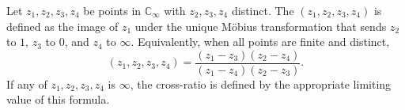 Let $z_1, z_2, z_3, z_4$ be points in $\mathbb{C}_\infty$ with $z_2, z_3, z_4$ distinct. The  $(z_1, z_2, z_3, z_4)$ is defined as the image of $z_1$ under the unique Möbius transformation that sends $z_2$ to $1$, $z_3$ to $0$, and $z_4$ to $\infty$. Equivalently, when all points are finite and distinct,
$$(z_1, z_2, z_3, z_4) = \frac{(z_1 - z_3)(z_2 - z_4)}{(z_1 - z_4)(z_2 - z_3)}.$$
If any of $z_1, z_2, z_3, z_4$ is $\infty$, the cross-ratio is defined by the appropriate limiting value of this formula.
